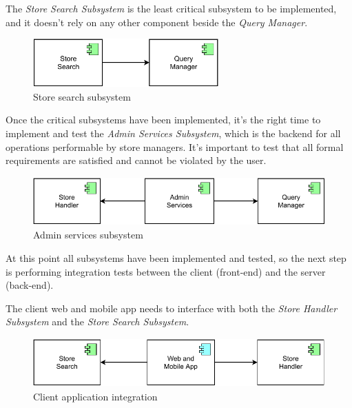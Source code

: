 The \emph{Store Search Subsystem} is the least critical subsystem to be implemented, and it doesn't rely on any other component beside the \emph{Query Manager}.

\begin{figure}[H]
    \centering
    \includegraphics[height=5em]{images/draw.io/store_search_subsystem.pdf}
    \caption{Store search subsystem}
    \label{fig:store_search_subsystem}
\end{figure}


Once the critical subsystems have been implemented, it's the right time to implement and test the \emph{Admin Services Subsystem}, which is the backend for all operations performable by store managers. It's important to test that all formal requirements are satisfied and cannot be violated by the user.
\begin{figure}[H]
    \centering
    \includegraphics[height=5em]{images/draw.io/admin_services_subsystem.pdf}
    \caption{Admin services subsystem}
    \label{fig:admin_services_subsystem}
\end{figure}

At this point all subsystems have been implemented and tested, so the next step is performing integration tests between the client (front-end) and the server (back-end).

The client web and mobile app needs to interface with both the \emph{Store Handler Subsystem} and the \emph{Store Search Subsystem}.

\begin{figure}[H]
    \centering
    \includegraphics[height=5em]{images/draw.io/web_mobile_app_integration.pdf}
    \caption{Client application integration}
    \label{fig:client_application_integration}
\end{figure}

